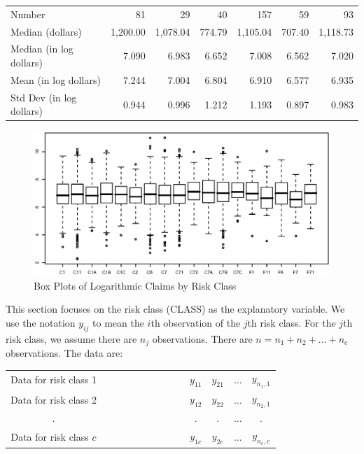 \begin{table}[h]
\begin{tabular}{l|rrrrrr}
    Number &         81 &         29 &         40 &        157 &         59 &         93 \\
Median (dollars) &   1,200.00 &   1,078.04 &     774.79 &   1,105.04 &     707.40 &   1,118.73 \\
Median (in log dollars) &      7.090 &      6.983 &      6.652 &      7.008 &      6.562 &      7.020 \\
Mean (in log dollars) &      7.244 &      7.004 &      6.804 &      6.910 &      6.577 &      6.935 \\
Std Dev (in log dollars) &      0.944 &      0.996 &      1.212 &
1.193 &      0.897 &      0.983 \\
\hline
\end{tabular}
\end{table}

\begin{figure}[htp]
  \begin{center}
    \includegraphics[width=1\textwidth]{Chapter4/Fig4BoxplotAuto.eps}
        \caption{\label{F4:BoxplotAuto} \small  Box Plots of Logarithmic Claims by Risk Class}
  \end{center}
\end{figure}

\linejed


This section focuses on the risk class (CLASS) as
the explanatory variable. We use the notation $y_{ij}$ to mean
the $i$th observation of the $j$th risk class. For the $j$th risk class, we assume
there are $n_j$ observations. There are $n=n_1+n_2+\ldots +n_c$
observations. The data are:

\begin{center}
\begin{tabular}{cccccc}
Data for risk class 1 & \ \ \ \ \ \ \ \ \ \ \ \ \ \ \  & $y_{11}$ & $y_{21}$ & $%
\ldots $ & $y_{n_1,1}$ \\
Data for risk class 2 &  & $y_{12}$ & $y_{22}$ & $\ldots $ & $y_{n_2,1}$ \\
. &  & $.$ & $.$ & $\ldots$ & $.$ \\
Data for risk class $c$ &  & $y_{1c}$ & $y_{2c}$ & $\ldots $ & $y_{n_c,c}$%
\end{tabular}
\end{center}

